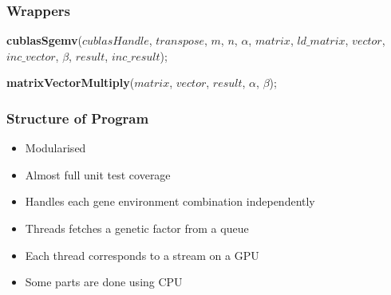 \documentclass{beamer}
\begin{document}
\begin{frame}
\frametitle{Wrappers}

\begin{algorithm}[H]
\DontPrintSemicolon
\SetStartEndCondition{ (}{)}{)}\SetAlgoBlockMarkers{\{}{\}}%
%
%
%
%
%
\AlgoDisplayBlockMarkers\SetAlgoNoLine%

\textbf{cublasSgemv}($cublasHandle$, $transpose$, $m$, $n$, $\alpha$, $matrix$, $ld\_matrix$, $vector$, $inc\_vector$,
      $\beta$, $result$, $inc\_result$);

\end{algorithm}

\begin{algorithm}[H]
\DontPrintSemicolon
\SetStartEndCondition{ (}{)}{)}\SetAlgoBlockMarkers{\{}{\}}%
%
%
%
%
%
\AlgoDisplayBlockMarkers\SetAlgoNoLine%

\BlankLine \BlankLine

\textbf{matrixVectorMultiply}($matrix$, $vector$, $result$, $\alpha$, $\beta$);

\end{algorithm}

\end{frame}

\begin{frame}
\frametitle{Structure of Program}

\begin{itemize}
 \item Modularised
 \item Almost full unit test coverage
 \item Handles each gene environment combination independently
 \item Threads fetches a genetic factor from a queue
 \item Each thread corresponds to a stream on a GPU
 \item Some parts are done using CPU

\end{itemize}

\end{frame}
\end{document}
